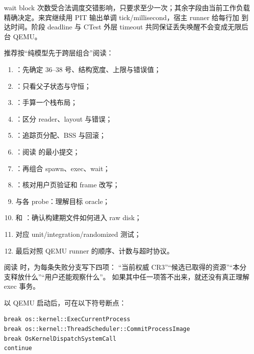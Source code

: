 wait block 次数受合法调度交错影响，只要求至少一次；其余字段由当前工作负载
精确决定。来宾继续用 PIT 输出单调 tick/millisecond，宿主 runner 给每行加
\code{[QEMU][T+...ms]} 到达时间。阶段 deadline 与 CTest 外层 timeout
共同保证丢失唤醒不会变成无限后台 QEMU。

推荐按“纯模型先于跨层组合”阅读：

\begin{enumerate}
  \item {}：先确定 36--38
        号、结构宽度、上限与错误值；
  \item {}：只看父子状态与守恒；
  \item {}：手算一个栈布局；
  \item {}：区分 reader、layout 与错误；
  \item {}：追踪页分配、BSS 与回滚；
  \item {}：阅读
         的最小提交；
  \item {}：再组合 spawn、exec、wait；
  \item {}：核对用户页验证和 frame 改写；
  \item {} 与各 probe：理解目标 oracle；
  \item {} 和
        ：确认构建期文件如何进入 raw disk；
  \item 对应 unit/integration/randomized 测试；
  \item 最后对照 QEMU runner 的顺序、计数与超时协议。
\end{enumerate}

阅读  时，为每条失败分支写下四项：
“当前权威 CR3”“候选已取得的资源”“本分支释放什么”“用户还能观察什么”。
如果其中任一项答不出来，就还没有真正理解 exec 事务。

以 QEMU  启动后，可在以下符号断点：

\begin{lstlisting}[caption={exec 的硬件状态观察点}]
break os::kernel::ExecCurrentProcess
break os::kernel::ThreadScheduler::CommitProcessImage
break OsKernelDispatchSystemCall
continue
\end{lstlisting}

